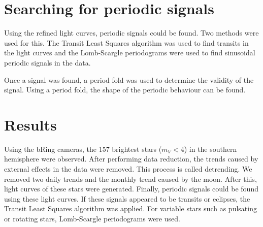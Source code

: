 \documentclass{aa}
\begin{document}
\section{Searching for periodic signals}
\label{sec:tlslomb}
Using the refined light curves, periodic signals could be found. Two methods were used for this. The Transit Least Squares algorithm was used to find transits in the light curves and the Lomb-Scargle periodograms were used to find sinusoidal periodic signals in the data.

Once a signal was found, a period fold was used to determine the validity of the signal. Using a period fold, the shape of the periodic behaviour can be found.

\section{Results}
\label{sec:results}
Using the bRing cameras, the 157 brightest stars ($m_V < 4$) in the southern hemisphere were observed. After performing data reduction, the trends caused by external effects in the data were removed. This process is called detrending. We removed two daily trends and the monthly trend caused by the moon. After this, light curves of these stars were generated. Finally, periodic signals could be found using these light curves. If these signals appeared to be transits or eclipses, the Transit Least Squares algorithm \citep{Hippke_2019} was applied. For variable stars such as pulsating or rotating stars, Lomb-Scargle periodograms \citep{VanderPlas_2012} \citep{VanderPlas_2015} were used. 
\end{document}
